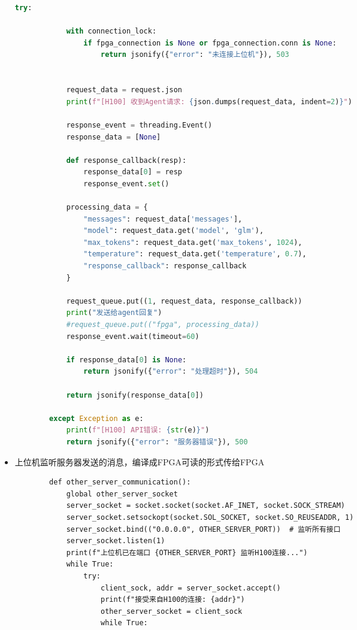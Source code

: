 \documentclass[AutoFakeBold,AutoFakeSlant,language=chinese,degree=bachelor]{sustechthesis}
\begin{document}
\begin{itemize}
\begin{lstlisting}[language=python]
        try:

            with connection_lock:
                if fpga_connection is None or fpga_connection.conn is None:
                    return jsonify({"error": "未连接上位机"}), 503


            request_data = request.json
            print(f"[H100] 收到Agent请求: {json.dumps(request_data, indent=2)}")

            response_event = threading.Event()
            response_data = [None]

            def response_callback(resp):
                response_data[0] = resp
                response_event.set()

            processing_data = {
                "messages": request_data['messages'],
                "model": request_data.get('model', 'glm'),
                "max_tokens": request_data.get('max_tokens', 1024),
                "temperature": request_data.get('temperature', 0.7),
                "response_callback": response_callback
            }

            request_queue.put((1, request_data, response_callback))
            print("发送给agent回复")
            #request_queue.put(("fpga", processing_data))
            response_event.wait(timeout=60)

            if response_data[0] is None:
                return jsonify({"error": "处理超时"}), 504

            return jsonify(response_data[0])

        except Exception as e:
            print(f"[H100] API错误: {str(e)}")
            return jsonify({"error": "服务器错误"}), 500
        \end{lstlisting}
        \item 上位机监听服务器发送的消息，编译成FPGA可读的形式传给FPGA
        \begin{lstlisting}
        def other_server_communication():
            global other_server_socket
            server_socket = socket.socket(socket.AF_INET, socket.SOCK_STREAM)
            server_socket.setsockopt(socket.SOL_SOCKET, socket.SO_REUSEADDR, 1)
            server_socket.bind(("0.0.0.0", OTHER_SERVER_PORT))  # 监听所有接口
            server_socket.listen(1)
            print(f"上位机已在端口 {OTHER_SERVER_PORT} 监听H100连接...")
            while True:
                try:
                    client_sock, addr = server_socket.accept()
                    print(f"接受来自H100的连接: {addr}")
                    other_server_socket = client_sock
                    while True:


\end{lstlisting}
\end{itemize}
\end{document}
